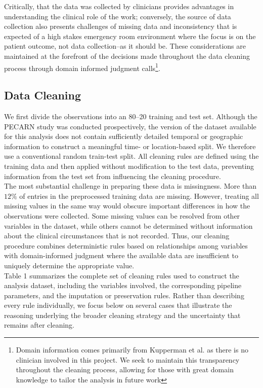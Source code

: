 \documentclass[10pt,letterpaper]{article}
\begin{document}
Critically, that the data was collected by clinicians provides advantages in understanding the clinical role of the work; conversely, the source of data collection also presents challenges of missing data and inconsistency that is expected of a high stakes emergency room environment where the focus is on the patient outcome, not data collection--as it should be. These considerations are maintained at the forefront of the decisions made throughout the data cleaning process through domain informed judgment calls\footnote{Domain information comes primarily from Kupperman et al.\cite{kuppermann_identification_2009} as there is no clinician involved in this project. We seek to maintain this transparency throughout the cleaning process, allowing for those with great domain knowledge to tailor the analysis in future work}.


\subsection{Data Cleaning}\label{data-cleaning}

We first divide the observations into an 80--20 training and test set. Although the PECARN study was conducted prospectively, the version of the dataset available for this analysis does not contain sufficiently detailed temporal or geographic information to construct a meaningful time- or location-based split. We therefore use a conventional random train-test split. All cleaning rules are defined using the training data and then applied without modification to the test data, preventing information from the test set from influencing the cleaning procedure.\\

The most substantial challenge in preparing these data is missingness. More than $12\%$ of entries in the preprocessed training data are missing. However, treating all missing values in the same way would obscure important differences in how the observations were collected. Some missing values can be resolved from other variables in the dataset, while others cannot be determined without information about the clinical circumstances that is not recorded. Thus, our cleaning procedure combines deterministic rules based on relationships among variables with domain-informed judgment where the available data are insufficient to uniquely determine the appropriate value. \\

Table 1 summarizes the complete set of cleaning rules used to construct the analysis dataset, including the variables involved, the corresponding pipeline parameters, and the imputation or preservation rules. Rather than describing every rule individually, we focus below on several cases that illustrate the reasoning underlying the broader cleaning strategy and the uncertainty that remains after cleaning.
\end{document}
